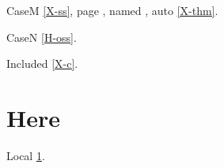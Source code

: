 \documentclass{article}
\begin{document}
CaseM \ref{X-ss}, page \pageref{X-front}, named ,
auto \autoref{X-thm}.

CaseN \ref{H-oss}.

Included \ref{X-c}.

\section{Here}\label{here}
Local \ref{here}.
\end{document}
